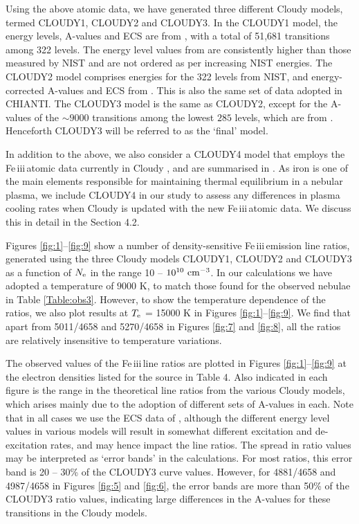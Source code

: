 \documentclass{emulateapj}
\def\unit #1{\,{\rm #1}}
\newcommand\cmcubei{\rm \,\unit{cm^{-3}}}
\newcommand\fe{Fe\,{\sc iii}\,}
\begin{document}
Using the above atomic data, we have generated three different Cloudy models, termed CLOUDY1, CLOUDY2 and CLOUDY3. In the CLOUDY1 
model, the energy levels, A-values and ECS  are from \citet{2014ApJ...785...99B}, with a total of 51,681 transitions among 322 
levels. The energy level values from \citet{2014ApJ...785...99B} are consistently higher than those measured by NIST and are not ordered as per increasing NIST energies. The CLOUDY2 model comprises energies for the 322 levels from NIST, and energy-corrected A-values and ECS from \citet{2014ApJ...785...99B}. This is also the same set of data adopted in CHIANTI. The CLOUDY3 model is the same as CLOUDY2, except for the A-values of the $\sim 9000$ transitions among the lowest $285$ levels, which are from  \citet{2009ADNDT..95..184D}. Henceforth CLOUDY3 will be referred to as the `final' model. 

In addition to the above, we also consider a CLOUDY4 model that employs the \fe atomic data currently in Cloudy \citep{1996A&AS..119..523Z}, and are summarised in \citet{2013MNRAS.429.3133L}. As iron is one of the main elements responsible for maintaining thermal equilibrium in a nebular
plasma, we include CLOUDY4 in our study to assess any differences in plasma cooling rates when Cloudy is updated with the new \fe atomic data. We discuss this in detail in the Section 4.2.


Figures \ref{fig:1}--\ref{fig:9} show a number of density-sensitive \fe emission line ratios, generated 
using the three Cloudy models CLOUDY1, CLOUDY2 and CLOUDY3 as a function of $N_{\rm e}$ in the range 10 -- $10^{10} \cmcubei$. In our 
calculations we have adopted a temperature of $9000$ K, to match those found for the observed nebulae in Table \ref{Table:obs3}. However, to show the 
temperature dependence of the ratios, we also plot results at $T_{\rm e}$ = 15000 K in Figures \ref{fig:1}--\ref{fig:9}. We find that
apart from 5011/4658 and 5270/4658 in Figures \ref{fig:7} and \ref{fig:8}, all the ratios are relatively insensitive to temperature variations. 



The observed values of the \fe line ratios are plotted in Figures \ref{fig:1}--\ref{fig:9} at the electron densities listed for 
the source in Table 4. Also indicated in each figure is the range in the theoretical line ratios from the various Cloudy models, 
which arises mainly due to the adoption of different sets of A-values in each. Note that 
in all cases we use the ECS data of \citet{2014ApJ...785...99B}, although the different energy level values in various models
will result in somewhat different excitation and de-excitation rates, and may hence impact the line ratios. 
The spread in ratio values may be interpreted as `error bands' in the calculations. For most ratios, this error band
is 20 -- 30\% of the CLOUDY3 curve values. However, for 4881/4658 and 4987/4658 in Figures \ref{fig:5} and \ref{fig:6}, the error bands are more than 50\% of the 
CLOUDY3 ratio values, indicating large differences in the A-values for these transitions in the Cloudy models.
\end{document}
